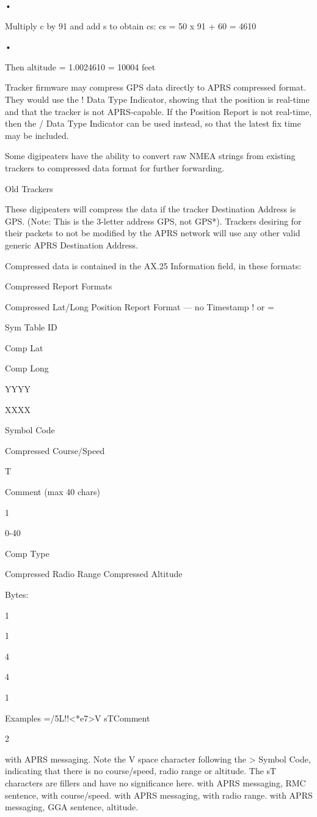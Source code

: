 {{{•

Multiply c by 91 and add s to obtain cs:
cs = 50 x 91 + 60
= 4610

•

Then altitude = 1.0024610
= 10004 feet

Tracker firmware may compress GPS data directly to APRS compressed
format. They would use the ! Data Type Indicator, showing that the position
is real-time and that the tracker is not APRS-capable.
If the Position Report is not real-time, then the / Data Type Indicator can be
used instead, so that the latest fix time may be included.


Some digipeaters have the ability to convert raw NMEA strings from existing
trackers to compressed data format for further forwarding.

Old Trackers

These digipeaters will compress the data if the tracker Destination Address is
GPS. (Note: This is the 3-letter address GPS, not GPS*).
Trackers desiring for their packets to not be modified by the APRS network
will use any other valid generic APRS Destination Address.

Compressed data is contained in the AX.25 Information field, in these
formats:

Compressed Report
Formats

Compressed Lat/Long Position Report Format — no Timestamp
! or
=

Sym
Table
ID

Comp
Lat

Comp
Long

YYYY

XXXX

Symbol
Code

Compressed
Course/Speed

T

Comment
(max 40
chars)

1

0-40

Comp
Type

Compressed Radio
Range
Compressed
Altitude

Bytes:

1

1

4

4

1

Examples
=/5L!!<*e7>V sTComment

2

with APRS messaging. Note the V space character following the >
Symbol Code, indicating that there is no course/speed, radio range or
altitude. The sT characters are fillers and have no significance here.
with APRS messaging, RMC sentence, with course/speed.
with APRS messaging, with radio range.
with APRS messaging, GGA sentence, altitude.

}}}
